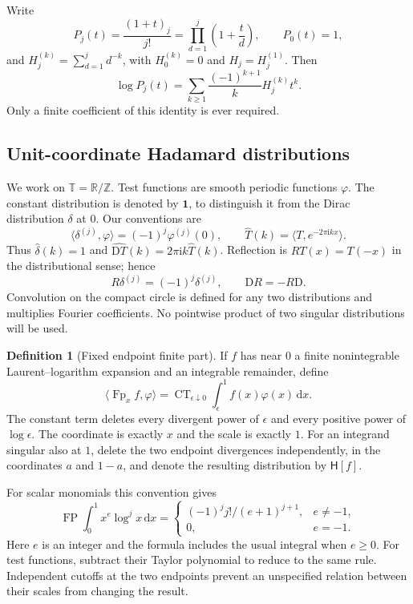 \documentclass[11pt,a4paper]{article}
\numberwithin{equation}{section}
\theoremstyle{definition}
\newtheorem{definition}[theorem]{Definition}
\newcommand{\T}{\mathbb T}
\newcommand{\ii}{\mathrm i}
\newcommand{\dd}{\,\mathrm d}
\newcommand{\D}{\mathrm D}
\newcommand{\FP}{\operatorname{FP}}
\newcommand{\Fp}{\operatorname{Fp}}
\newcommand{\CT}{\operatorname{CT}}
\newcommand{\HH}{\mathsf H}
\newcommand{\one}{\mathbf 1}
\begin{document}
Write
\begin{equation}\label{pc:P}
P_j(t)=\frac{(1+t)_j}{j!}=\prod_{d=1}^j\left(1+\frac td\right),\qquad P_0(t)=1,
\end{equation}
and $H_j^{(k)}=\sum_{d=1}^j d^{-k}$, with $H_0^{(k)}=0$ and $H_j=H_j^{(1)}$. Then
\begin{equation}\label{pc:logP}
\log P_j(t)=\sum_{k\ge1}\frac{(-1)^{k+1}}kH_j^{(k)}t^k.
\end{equation}
Only a finite coefficient of this identity is ever required.

\subsection{Unit-coordinate Hadamard distributions}
We work on $\T=\mathbb R/\mathbb Z$. Test functions are smooth periodic functions $\varphi$. The constant distribution is denoted by $\one$, to distinguish it from the Dirac distribution $\delta$ at $0$. Our conventions are
\[
\langle\delta^{(j)},\varphi\rangle=(-1)^j\varphi^{(j)}(0),\qquad
\widehat T(k)=\langle T,e^{-2\pi\ii kx}\rangle.
\]
Thus $\widehat\delta(k)=1$ and $\widehat{\D T}(k)=2\pi\ii k\widehat T(k)$. Reflection is $RT(x)=T(-x)$ in the distributional sense; hence
\begin{equation}\label{pc:reflection}
R\delta^{(j)}=(-1)^j\delta^{(j)},\qquad
\D R=-R\D.
\end{equation}
Convolution on the compact circle is defined for any two distributions and multiplies Fourier coefficients. No pointwise product of two singular distributions will be used.

\begin{definition}[Fixed endpoint finite part]\label{pc:fp-definition}
If $f$ has near $0$ a finite nonintegrable Laurent--logarithm expansion and an integrable remainder, define
\begin{equation}\label{pc:fp-pairing}
\langle\Fp_x f,\varphi\rangle
=\CT_{\epsilon\downarrow0}\int_\epsilon^1 f(x)\varphi(x)\dd x.
\end{equation}
The constant term deletes every divergent power of $\epsilon$ and every positive power of $\log\epsilon$. The coordinate is exactly $x$ and the scale is exactly $1$. For an integrand singular also at $1$, delete the two endpoint divergences independently, in the coordinates $a$ and $1-a$, and denote the resulting distribution by $\HH[f]$.
\end{definition}
For scalar monomials this convention gives
\begin{equation}\label{pc:monomial}
\FP\int_0^1x^e\log^j x\dd x=
\begin{cases}
(-1)^j j!/(e+1)^{j+1},&e\ne-1,\\
0,&e=-1.
\end{cases}
\end{equation}
Here $e$ is an integer and the formula includes the usual integral when $e\ge0$. For test functions, subtract their Taylor polynomial to reduce to the same rule. Independent cutoffs at the two endpoints prevent an unspecified relation between their scales from changing the result.
\end{document}

